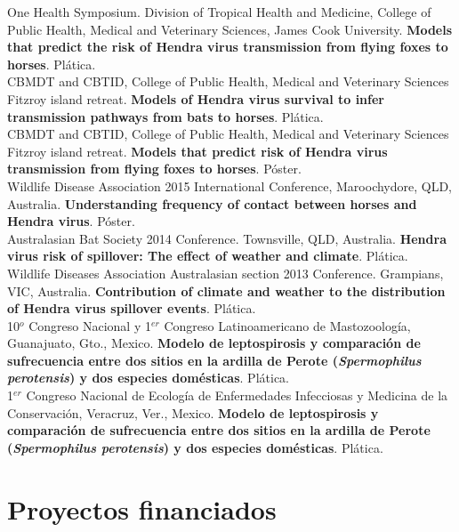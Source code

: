 \documentclass[11pt, letter]{article}
\newcommand{\years}[1]{\marginnote{\scriptsize #1}}
\begin{document}
\years{2016} One Health Symposium. Division of Tropical Health and Medicine, College of Public Health, Medical and Veterinary Sciences, James Cook University. \textbf{Models that predict the risk of Hendra virus transmission from flying foxes to horses}. Pl\'atica.\\

\years{2016} CBMDT and CBTID, College of Public Health, Medical and Veterinary Sciences Fitzroy island retreat. \textbf{Models of Hendra virus survival to infer transmission pathways from bats to horses}. Pl\'atica.\\

\years{2016} CBMDT and CBTID, College of Public Health, Medical and Veterinary Sciences Fitzroy island retreat. \textbf{Models that predict risk of Hendra virus transmission from flying foxes to horses}. P\'oster.\\

\years{2015} Wildlife Disease Association 2015 International Conference, Maroochydore, QLD, Australia. \textbf{Understanding frequency of contact between horses and Hendra virus}. P\'oster.\\

\years{2014} Australasian Bat Society 2014 Conference. Townsville, QLD, Australia. \textbf{Hendra virus risk of spillover: The effect of weather and climate}. Pl\'atica.\\

\years{2013} Wildlife Diseases Association Australasian section 2013 Conference. Grampians, VIC, Australia. \textbf{Contribution of climate and weather to the distribution of Hendra virus spillover events}. Pl\'atica.\\

\years{2010} 10$^o$ Congreso Nacional y 1$^{er}$ Congreso Latinoamericano de Mastozoolog\'ia, Guanajuato, Gto., Mexico. \textbf{Modelo de leptospirosis y comparaci\'on de sufrecuencia entre dos sitios en la ardilla de Perote (\emph{Spermophilus 
		perotensis}) y dos especies dom\'esticas}. Pl\'atica.\\

\years{2009} 1$^{er}$ Congreso Nacional de Ecolog\'ia de Enfermedades Infecciosas y Medicina de la Conservaci\'on, Veracruz, Ver., Mexico. \textbf{Modelo de leptospirosis y comparaci\'on de sufrecuencia entre dos sitios en la ardilla de Perote (\emph{Spermophilus perotensis}) y dos especies dom\'esticas}. Pl\'atica.\\

\section*{Proyectos financiados}
\end{document}
